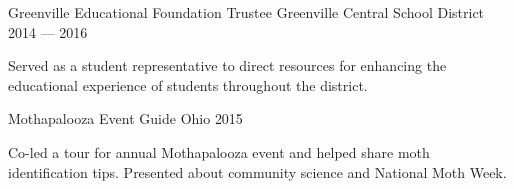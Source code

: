 \begin{cventries}
  \cventry
    {Greenville Educational Foundation} %
    {Trustee} %
    {Greenville Central School District} %
    {2014 — 2016} %
    {
      \begin{cvitems} %
        \item {Served as a student representative to direct resources for enhancing the educational experience of students throughout the district.}
      \end{cvitems}
    }

  \cventry
    {Mothapalooza} %
    {Event Guide} %
    {Ohio} %
    {2015} %
    {
      \begin{cvitems} %
        \item {Co-led a tour for annual Mothapalooza event and helped share moth identification tips. Presented about community science and National Moth Week.}
      \end{cvitems}
    }

\end{cventries}
